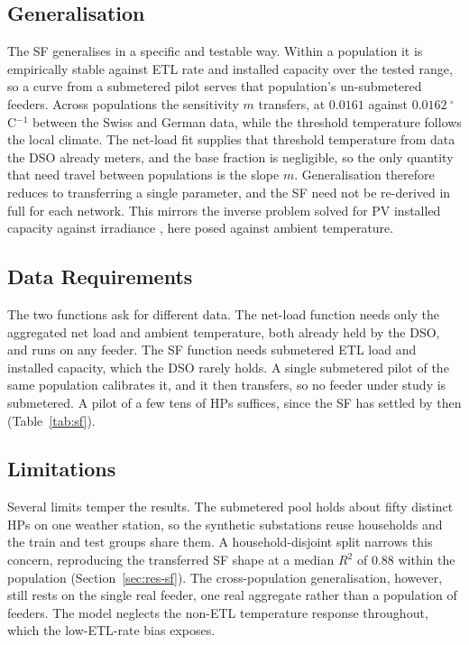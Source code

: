 \documentclass[9pt,journal,a4]{IEEEtran}
\newcommand{\chg}[1]{\textcolor{chgblue}{#1}}
\begin{document}
\subsection{Generalisation}

The SF generalises in a specific and testable way. Within a population it is empirically stable against ETL rate and installed capacity over the tested range, so a curve from a submetered pilot serves that population's un-submetered feeders. Across populations the sensitivity $m$ transfers, at $0.0161$ against $0.0162~^\circ$C$^{-1}$ between the Swiss and German data, while the threshold temperature follows the local climate. The net-load fit supplies that threshold temperature from data the DSO already meters, and the base fraction is negligible, so the only quantity that need travel between populations is the slope $m$. Generalisation therefore reduces to transferring a single parameter, and the SF need not be re-derived in full for each network. This mirrors the inverse problem solved for PV installed capacity against irradiance \cite{gouveia2026pvcapacity}, here posed against ambient temperature.

\subsection{Data Requirements}

The two functions ask for different data. The net-load function needs only the aggregated net load and ambient temperature, both already held by the DSO, and runs on any feeder. The SF function needs submetered ETL load and installed capacity, which the DSO rarely holds. A single submetered pilot of the same population calibrates it, and it then transfers, so no feeder under study is submetered. A pilot of a few tens of HPs suffices, since the SF has settled by then (Table~\ref{tab:sf}).

\subsection{Limitations}

Several limits temper the results. The submetered pool holds about fifty distinct HPs on one weather station, so the synthetic substations reuse households and the train and test groups share them. A household-disjoint split narrows this concern, reproducing the transferred SF shape at a median $R^2$ of \chg{0.88} within the population (Section~\ref{sec:res-sf}). The cross-population generalisation, however, still rests on the single real feeder, one real aggregate rather than a population of feeders. The model neglects the non-ETL temperature response throughout, which the low-ETL-rate bias exposes.
\end{document}
